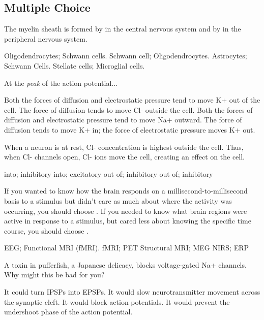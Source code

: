 \documentclass[]{exam}
\begin{document}
\begin{questions}

\section{Multiple Choice}

\question The myelin sheath is formed by \fillin in the central nervous system and by \fillin in the peripheral nervous system.
\begin{choices}
\choice  Oligodendrocytes; Schwann cells.
\choice  Schwann cell; Oligodendrocytes.
\choice  Astrocytes; Schwann Cells.
\choice  Stellate cells; Microglial cells.
\end{choices}

\question  At the \emph{peak} of the action potential... 
\begin{choices}
\choice Both the forces of diffusion and electrostatic pressure tend to move K+ out of the cell.
\choice The force of diffusion tends to move Cl- outside the cell.
\choice Both the forces of diffusion and electrostatic pressure tend to move Na+ outward.
\choice The force of diffusion tends to move K+ in; the force of electrostatic pressure moves K+ out.
\end{choices}

\question  When a neuron is at rest, Cl- concentration is highest outside the cell.  Thus, when Cl- channels open, Cl- ions move \fillin the cell, creating an \fillin effect on the cell.
\begin{choices}
\choice  into; inhibitory
\choice  into; excitatory
\choice  out of; inhibitory
\choice  out of; inhibitory
\end{choices}

\question  If you wanted to know how the brain responds on a millisecond-to-millisecond basis to a stimulus but didn’t care as much about where the activity was occurring, you should choose \fillin.  If you needed to know what brain regions were active in response to a stimulus, but cared less about knowing the specific time course, you should choose \fillin. 
\begin{choices}
\choice  EEG; Functional MRI (fMRI).
\choice  fMRI; PET 
\choice  Structural MRI; MEG
\choice  NIRS; ERP
\end{choices}

\question  A toxin in pufferfish, a Japanese delicacy, blocks voltage-gated Na+ channels.  Why might this be bad for you?
\begin{choices}
\choice  It could turn IPSPs into EPSPs.
\choice  It would slow neurotransmitter movement across the synaptic cleft.
\choice  It would block action potentials.
\choice  It would prevent the undershoot phase of the action potential.
\end{choices}


\end{questions}
\end{document}
